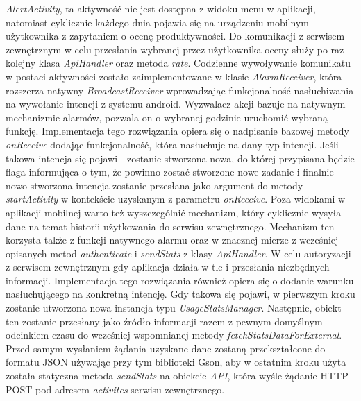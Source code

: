 \documentclass[a4paper,twoside,12pt]{book}
\begin{document}
\begin{description}
\textit{AlertActivity}, ta aktywność nie jest dostępna z widoku menu w aplikacji, natomiast cyklicznie każdego dnia pojawia się na urządzeniu mobilnym użytkownika z zapytaniem o ocenę produktywności. Do komunikacji z serwisem zewnętrznym w celu przesłania wybranej przez użytkownika oceny służy po raz kolejny klasa \textit{ApiHandler} oraz metoda \textit{rate}. Codzienne wywoływanie komunikatu w postaci aktywności zostało zaimplementowane w klasie \textit{AlarmReceiver}, która rozszerza natywny \textit{BroadcastReceiver}\cite{alarm_api} wprowadzając funkcjonalność nasłuchiwania na wywołanie intencji z systemu android. Wyzwalacz akcji bazuje na natywnym mechanizmie alarmów,  pozwala on  o wybranej godzinie uruchomić wybraną funkcję. Implementacja tego rozwiązania opiera się o nadpisanie bazowej metody \textit{onReceive} dodając funkcjonalność, która nasłuchuje na dany typ intencji.   Jeśli takowa intencja się pojawi - zostanie stworzona nowa, do której przypisana będzie flaga informująca o tym, że powinno zostać stworzone nowe zadanie i finalnie nowo stworzona intencja zostanie przesłana jako argument do metody \textit{startActivity} w kontekście uzyskanym z parametru \textit{onReceive}. Poza widokami w aplikacji mobilnej warto też wyszczególnić mechanizm, który cyklicznie wysyła dane na temat historii użytkowania do serwisu zewnętrznego. Mechanizm ten korzysta także z funkcji natywnego alarmu oraz w znacznej mierze z wcześniej opisanych metod \textit{authenticate} i \textit{sendStats} z klasy \textit{ApiHandler}. W celu autoryzacji z serwisem zewnętrznym gdy aplikacja działa w tle i przesłania niezbędnych informacji. Implementacja tego rozwiązania również opiera się o dodanie warunku nasłuchującego na konkretną intencję. Gdy takowa się pojawi, w pierwszym kroku zostanie utworzona nowa instancja typu \textit{UsageStatsManager}. Następnie, obiekt ten zostanie przesłany jako źródło informacji razem z pewnym domyślnym odcinkiem czasu do wcześniej wspomnianej metody \textit{fetchStatsDataForExternal}. Przed samym wysłaniem żądania uzyskane dane zostaną przekształcone do formatu JSON używając przy tym biblioteki Gson, aby w ostatnim kroku użyta została statyczna metoda \textit{sendStats} na obiekcie \textit{API}, która wyśle żądanie HTTP POST pod adresem \textit{activites} serwisu zewnętrznego.
\begin{figure}[h!]
    \centering

\end{figure}
\end{description}
\end{document}
